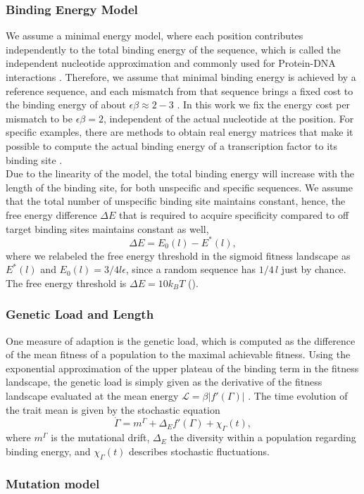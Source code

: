 \subsubsection*{Binding Energy Model}
    We assume a minimal energy model, where each position contributes independently to the total binding energy of the sequence, which is called the independent nucleotide approximation and commonly used for Protein-DNA interactions \cite{stormo_specificity_1998,djordjevic_selex_2007}. Therefore, we assume that minimal binding energy is achieved by a reference sequence, and each mismatch from that sequence brings a fixed cost to the binding energy of about $\epsilon\beta\approx 2-3$ \cite{lassig_biophysics_2007}. In this work we fix the energy cost per mismatch to be $\epsilon\beta=2$, independent of the actual nucleotide at the position. For specific examples, there are methods to obtain real energy matrices that make it possible to compute the actual binding energy of a transcription factor to its binding site \cite{barnes_mapping_2019,ireland_deciphering_2020}.\\
    Due to the linearity of the model, the total binding energy will increase with the length of the binding site, for both unspecific and specific sequences. We assume that the total number of unspecific binding site maintains constant, hence, the free energy difference $\Delta E$ that is required to acquire specificity compared to off target binding sites maintains constant as well,
    \begin{equation}
		\Delta E  = E_0(l) - E^*(l),
	\end{equation}
    where we relabeled the free energy threshold in the sigmoid fitness landscape as $E^*(l)$ and $E_0(l) = 3/4 l\epsilon$, since a random sequence has $1/4\, l$ just by chance. The free energy threshold is $\Delta E=10 k_B T$ ().
    

	\subsubsection*{Genetic Load and Length}
	One measure of adaption is the genetic load, which is computed as the difference of the mean fitness of a population to the maximal achievable fitness. Using the exponential approximation of the upper plateau of the binding term in the fitness landscape, the genetic load is simply given as the derivative of the fitness landscape evaluated at the mean energy $\mathcal{L} = \beta |f'(\Gamma)|$ \cite{held_survival_2019}. The time evolution of the trait mean is given by the stochastic equation
	\begin{equation}
		\dot{\Gamma}=m^\Gamma+\Delta_E f'(\Gamma)+\chi_\Gamma(t),
    \end{equation}
    where $m^\Gamma$ is the mutational drift, $\Delta_E$ the diversity within a population regarding binding energy, and $\chi_\Gamma(t)$ describes stochastic fluctuations. 
	\subsubsection*{Mutation model}